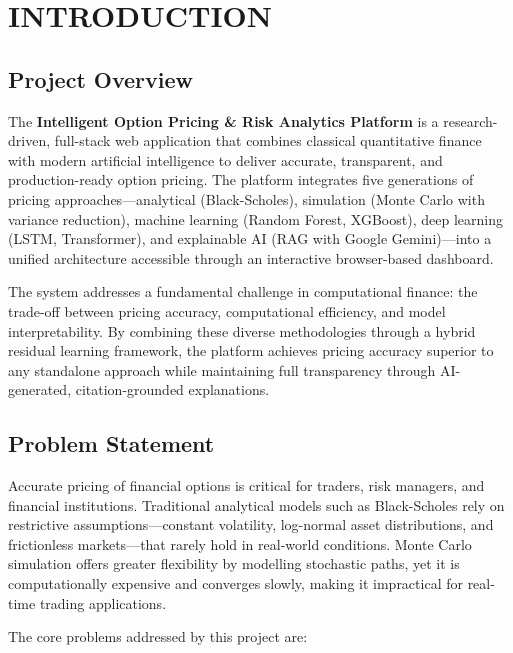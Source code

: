 \documentclass[12pt,a4paper]{report}
\begin{document}
\setcounter{page}{1}

\chapter{INTRODUCTION}

\section{Project Overview}

The \textbf{Intelligent Option Pricing \& Risk Analytics Platform} is a research-driven, full-stack web application that combines classical quantitative finance with modern artificial intelligence to deliver accurate, transparent, and production-ready option pricing. The platform integrates five generations of pricing approaches---analytical (Black-Scholes), simulation (Monte Carlo with variance reduction), machine learning (Random Forest, XGBoost), deep learning (LSTM, Transformer), and explainable AI (RAG with Google Gemini)---into a unified architecture accessible through an interactive browser-based dashboard.

The system addresses a fundamental challenge in computational finance: the trade-off between pricing accuracy, computational efficiency, and model interpretability. By combining these diverse methodologies through a hybrid residual learning framework, the platform achieves pricing accuracy superior to any standalone approach while maintaining full transparency through AI-generated, citation-grounded explanations.

\section{Problem Statement}

Accurate pricing of financial options is critical for traders, risk managers, and financial institutions. Traditional analytical models such as Black-Scholes rely on restrictive assumptions---constant volatility, log-normal asset distributions, and frictionless markets---that rarely hold in real-world conditions. Monte Carlo simulation offers greater flexibility by modelling stochastic paths, yet it is computationally expensive and converges slowly, making it impractical for real-time trading applications.

The core problems addressed by this project are:
\end{document}
